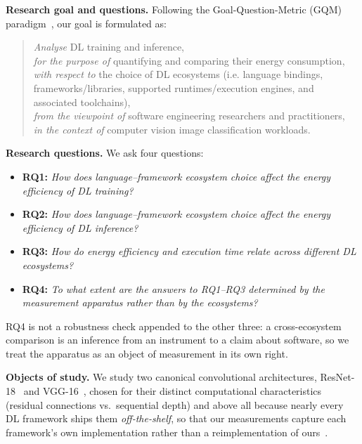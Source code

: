 \textbf{Research goal and questions.}
Following the Goal-Question-Metric (GQM) paradigm~\citep{basili1994gqm}, our goal is formulated as:
\begin{quote}
    \emph{Analyse} DL training and inference, \\
    \emph{for the purpose of} quantifying and comparing their energy consumption, \\
    \emph{with respect to} the choice of DL ecosystems (i.e. language bindings, frameworks/libraries, supported runtimes/execution engines, and associated toolchains), \\
    \emph{from the viewpoint of} software engineering researchers and practitioners, \\
    \emph{in the context of} computer vision image classification workloads.
\end{quote}

\textbf{Research questions.} We ask four questions:

\begin{itemize}
    \item \textbf{RQ1:} \textit{How does language--framework ecosystem choice affect the energy efficiency of DL \emph{training}?}
    \item \textbf{RQ2:} \textit{How does language--framework ecosystem choice affect the energy efficiency of DL \emph{inference}?}
    \item \textbf{RQ3:} \textit{How do energy efficiency and execution time relate across different DL ecosystems?}
    \item \textbf{RQ4:} \textit{To what extent are the answers to RQ1--RQ3 determined by the measurement apparatus rather than by the ecosystems?}
\end{itemize}

RQ4 is not a robustness check appended to the other three: a cross-ecosystem
comparison is an inference from an instrument to a claim about software, so we
treat the apparatus as an object of measurement in its own right.

\textbf{Objects of study.}
We study two canonical convolutional architectures, ResNet-18~\citep{he2015resnet}
and VGG-16~\citep{simonyan2014vgg}, chosen for their distinct computational
characteristics (residual connections vs.\ sequential depth) and above all
because nearly every DL framework ships them \emph{off-the-shelf}, so that our
measurements capture each framework's own implementation rather than a
reimplementation of ours~\citep{xu2021survey,mehlin2023towards,tripp2024measuring}.

